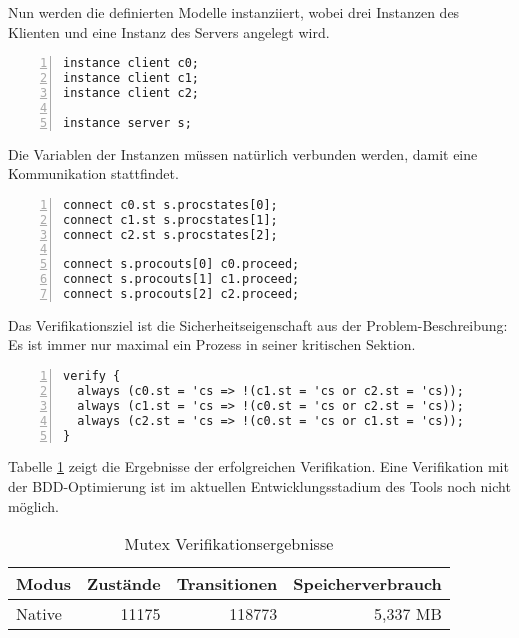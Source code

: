 Nun werden die definierten Modelle instanziiert, wobei drei Instanzen des Klienten und eine Instanz des Servers angelegt wird.
\begin{lstlisting}[language=gtl,numbers=left,firstnumber=last]
instance client c0;
instance client c1;
instance client c2;

instance server s;
\end{lstlisting}
Die Variablen der Instanzen müssen natürlich verbunden werden, damit eine Kommunikation stattfindet.
\begin{lstlisting}[language=gtl,numbers=left,firstnumber=last]
connect c0.st s.procstates[0];
connect c1.st s.procstates[1];
connect c2.st s.procstates[2];

connect s.procouts[0] c0.proceed;
connect s.procouts[1] c1.proceed;
connect s.procouts[2] c2.proceed;
\end{lstlisting}
Das Verifikationsziel ist die Sicherheitseigenschaft aus der Problem-Beschreibung:
Es ist immer nur maximal ein Prozess in seiner kritischen Sektion.
\begin{lstlisting}[language=gtl,numbers=left,firstnumber=last]
verify {
  always (c0.st = 'cs => !(c1.st = 'cs or c2.st = 'cs));
  always (c1.st = 'cs => !(c0.st = 'cs or c2.st = 'cs));
  always (c2.st = 'cs => !(c0.st = 'cs or c1.st = 'cs));
}
\end{lstlisting}
Tabelle \ref{tab:mutex_results} zeigt die Ergebnisse der erfolgreichen Verifikation.
Eine Verifikation mit der BDD-Optimierung ist im aktuellen Entwicklungsstadium des Tools noch nicht möglich.
\begin{table}
  \centering
  \begin{tabular}{|l|r|r|r|}
    \hline
    \textbf{Modus} & \textbf{Zustände} & \textbf{Transitionen} & \textbf{Speicherverbrauch}\\
    \hline
    Native & 11175 & 118773 & 5,337 MB\\
    \hline
  \end{tabular}
  \caption{Mutex Verifikationsergebnisse}
  \label{tab:mutex_results}
\end{table}

